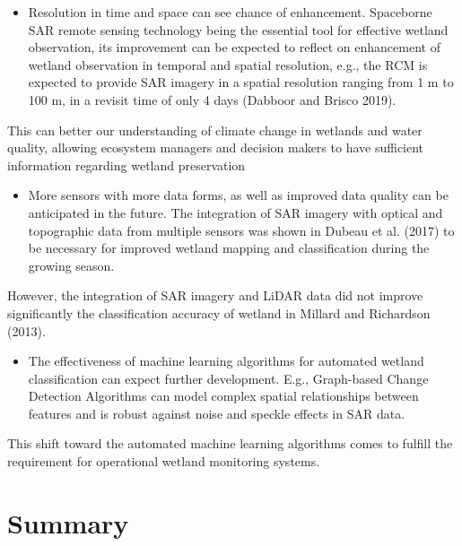 \documentclass[
  letterpaper,
  DIV=11,
  numbers=noendperiod]{scrreprt}
\providecommand{\tightlist}{%
  \setlength{\itemsep}{0pt}\setlength{\parskip}{0pt}}\usepackage{longtable,booktabs,array}
\begin{document}
\begin{itemize}
\tightlist
\item
  Resolution in time and space can see chance of enhancement. Spaceborne
  SAR remote sensing technology being the essential tool for effective
  wetland observation, its improvement can be expected to reflect on
  enhancement of wetland observation in temporal and spatial resolution,
  e.g., the RCM is expected to provide SAR imagery in a spatial
  resolution ranging from 1 m to 100 m, in a revisit time of only 4 days
  (Dabboor and Brisco 2019).
\end{itemize}

This can better our understanding of climate change in wetlands and
water quality, allowing ecosystem managers and decision makers to have
sufficient information regarding wetland preservation

\begin{itemize}
\tightlist
\item
  More sensors with more data forms, as well as improved data quality
  can be anticipated in the future. The integration of SAR imagery with
  optical and topographic data from multiple sensors was shown in Dubeau
  et al. (2017) to be necessary for improved wetland mapping and
  classification during the growing season.
\end{itemize}

However, the integration of SAR imagery and LiDAR data did not improve
significantly the classification accuracy of wetland in Millard and
Richardson (2013).

\begin{itemize}
\tightlist
\item
  The effectiveness of machine learning algorithms for automated wetland
  classification can expect further development. E.g., Graph-based
  Change Detection Algorithms can model complex spatial relationships
  between features and is robust against noise and speckle effects in
  SAR data.
\end{itemize}

This shift toward the automated machine learning algorithms comes to
fulfill the requirement for operational wetland monitoring systems.


\hypertarget{summary-8}{%
\chapter{Summary}\label{summary-8}}
\end{document}
